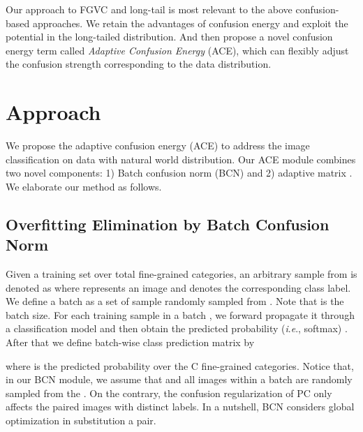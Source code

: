 \documentclass{article}
\newcommand{\ie}{\textit{i}.\textit{e}.}
\begin{document}
Our approach to FGVC and long-tail is most relevant to the above confusion-based approaches. We retain the advantages of confusion energy and exploit the potential in the long-tailed distribution. And then propose a novel confusion energy term called {\em Adaptive Confusion Energy} (ACE), which can flexibly adjust the confusion strength corresponding to the data distribution.

\section{Approach}
\label{sec:approach}


We propose the adaptive confusion energy (ACE) to address the image classification on data with natural world distribution. Our ACE module combines two novel components: 1) Batch confusion norm (BCN) and 2) adaptive matrix . We elaborate our method as follows. 


\subsection{Overfitting Elimination by Batch Confusion Norm}
\label{sec:BCN}

Given a training set  over total  fine-grained categories, an arbitrary sample  from  is denoted as  where  represents an image and  denotes the corresponding class label. We define a batch  as a set of sample  randomly sampled from . Note that  is the batch size. For each training sample  in a batch , we forward propagate it through a classification model  and then obtain the predicted probability (\ie, softmax) . After that we define batch-wise class prediction matrix  by 
\begin{linenomath}

\end{linenomath}
where  is the predicted probability over the C fine-grained categories. Notice that, in our BCN module, we assume that  and all images within a batch  are randomly sampled from the . On the contrary, the confusion regularization of PC \cite{dubey2018pairwise} only affects the paired images with distinct labels. In a nutshell, BCN considers global optimization in substitution a pair.  
\end{document}
